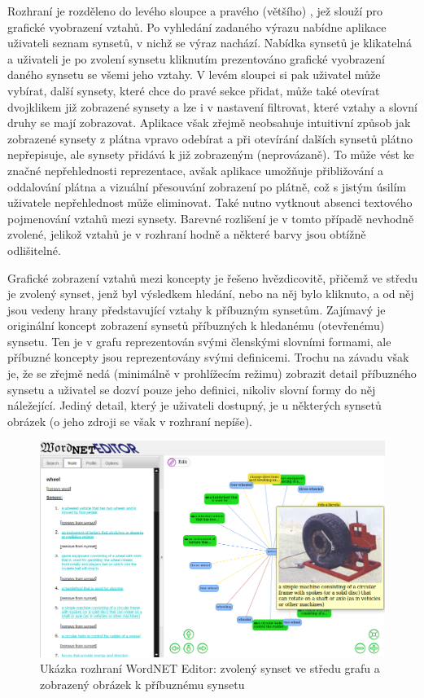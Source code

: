 \documentclass[a4paper, 11pt, oneside]{book}
\begin{document}
				Rozhraní je rozděleno do levého sloupce a pravého (většího) , jež slouží pro grafické vyobrazení vztahů. Po vyhledání zadaného výrazu nabídne aplikace uživateli seznam synsetů, v nichž se výraz nachází. Nabídka synsetů je klikatelná a uživateli je po zvolení synsetu kliknutím prezentováno grafické vyobrazení daného synsetu se všemi jeho vztahy. V levém sloupci si pak uživatel může vybírat, další synsety, které chce do pravé sekce přidat, může také otevírat dvojklikem již zobrazené synsety a lze i v nastavení filtrovat, které vztahy a slovní druhy se mají zobrazovat. Aplikace však zřejmě neobsahuje intuitivní způsob jak zobrazené synsety z plátna vpravo odebírat a při otevírání dalších synsetů plátno nepřepisuje, ale synsety přidává k již zobrazeným (neprovázaně). To může vést ke značné nepřehlednosti reprezentace, avšak aplikace umožňuje přibližování a oddalování plátna a vizuální přesouvání zobrazení po plátně, což s jistým úsilím uživatele nepřehlednost může eliminovat. Také nutno vytknout absenci textového pojmenování vztahů mezi synsety. Barevné rozlišení je v tomto případě nevhodně zvolené, jelikož vztahů je v rozhraní hodně a některé barvy jsou obtížně odlišitelné.

				Grafické zobrazení vztahů mezi koncepty je řešeno hvězdicovitě, přičemž ve středu je zvolený synset, jenž byl výsledkem hledání, nebo na něj bylo kliknuto, a od něj jsou vedeny hrany představující vztahy k příbuzným synsetům. Zajímavý je originální koncept zobrazení synsetů příbuzných k hledanému (otevřenému) synsetu. Ten je v grafu reprezentován svými členskými slovními formami, ale příbuzné koncepty jsou reprezentovány svými definicemi. Trochu na závadu však je, že se zřejmě nedá (minimálně v prohlížecím režimu) zobrazit detail příbuzného synsetu a uživatel se dozví pouze jeho definici, nikoliv slovní formy do něj náležející. Jediný detail, který je uživateli dostupný, je u některých synsetů obrázek (o jeho zdroji se však v rozhraní nepíše).

				\begin{figure}[h]
					\centering
					\includegraphics[width=1.0\textwidth]{wneditor.png}
					\caption{Ukázka rozhraní WordNET Editor: zvolený synset ve středu grafu a zobrazený obrázek k příbuznému synsetu}
					\label{fig:wneditor}
				\end{figure}
\end{document}
